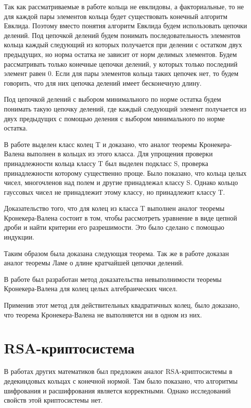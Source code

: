 \documentclass[a4paper,12pt]{article} %
\begin{document}
Так как рассматриваемые в работе кольца не евклидовы, а факториальные, то не для каждой пары элементов кольца будет существовать конечный алгоритм Евклида.
Поэтому вместо понятия алгоритм Евклида будем использовать цепочки делений.
Под цепочкой делений будем понимать последовательность элементов кольца каждый следующий из которых получается при делении с остатком двух предыдущих, но норма остатка не зависит от норм делимых элементов.
Будем рассматривать только конечные цепочки делений, у которых только последний элемент равен $0$.
Если для пары элементов кольца таких цепочек нет, то будем говорить, что для них цепочка делений имеет бесконечную длину.
    
Под цепочкой делений с выбором минимального по норме остатка будем понимать такую цепочку делений, где каждый следующий элемент получается из двух предыдущих с помощью деления с выбором минимального по норме остатка.

В работе выделен класс колец T и доказано, что аналог теоремы Кронекера-Валена выполнен в кольцах из этого класса.
Для упрощения проверки принадлежности кольца классу T был выделен подкласс S, проверка принадлежности которому существенно проще.
Было показано, что кольца целых чисел, многочленов над полем и другие принадлежал классу S.
Однако кольцо гауссовых чисел не принадлежит этому классу, но принадлежит классу T.

Доказательство того, что для колец из класса T выполнен аналог теоремы Кронекера-Валена состоит в том, чтобы рассмотреть уравнение в виде цепной дроби и найти критерии его разрешимости.
Это было сделано с помощью индукции.

Таким образом была доказана следующая теорема.
Так же в работе доказан аналог теоремы Ламе о длине кратчайшей цепочки делений.

В работе был разработан метод доказательства невыполнимости теоремы Кронекера-Валена для колец целых алгебраических чисел.

Применив этот метод для действительных квадратичных колец, было доказано, что теорема Кронекера-Валена не выполняется ни в одном из них.

\section{RSA-криптосистема}

В работах других математиков был предложен аналог RSA-криптосистемы в дедекиндовых кольцах с конечной нормой.
Там было показано, что алгоритмы шифрования и расшифрования является корректными.
Однако исследований свойств этой криптосистемы нет.
\end{document}
